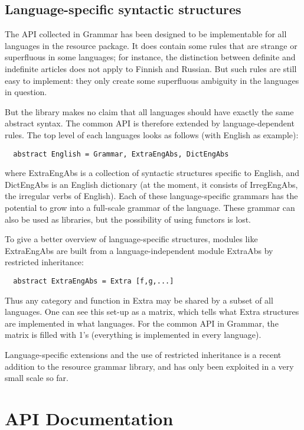\documentclass[11pt,a4paper]{article}
\begin{document}
\subsection{Language-specific syntactic structures}
The API collected in Grammar has been designed to be implementable for
all languages in the resource package. It does contain some rules that
are strange or superfluous in some languages; for instance, the distinction
between definite and indefinite articles does not apply to Finnish and Russian.
But such rules are still easy to implement: they only create some superfluous
ambiguity in the languages in question.

But the library makes no claim that all languages should have exactly the same
abstract syntax. The common API is therefore extended by language-dependent
rules. The top level of each languages looks as follows (with English as example):

\begin{verbatim}
  abstract English = Grammar, ExtraEngAbs, DictEngAbs
\end{verbatim}
where ExtraEngAbs is a collection of syntactic structures specific to English,
and DictEngAbs is an English dictionary (at the moment, it consists of IrregEngAbs,
the irregular verbs of English). Each of these language-specific grammars has 
the potential to grow into a full-scale grammar of the language. These grammar
can also be used as libraries, but the possibility of using functors is lost.

To give a better overview of language-specific structures, modules like ExtraEngAbs
are built from a language-independent module ExtraAbs by restricted inheritance:

\begin{verbatim}
  abstract ExtraEngAbs = Extra [f,g,...]
\end{verbatim}
Thus any category and function in Extra may be shared by a subset of all
languages. One can see this set-up as a matrix, which tells what Extra structures
are implemented in what languages. For the common API in Grammar, the matrix
is filled with 1's (everything is implemented in every language).

Language-specific extensions and the use of restricted
inheritance is a recent addition to the resource grammar library, and
has only been exploited in a very small scale so far.

\section{API Documentation}
\end{document}
